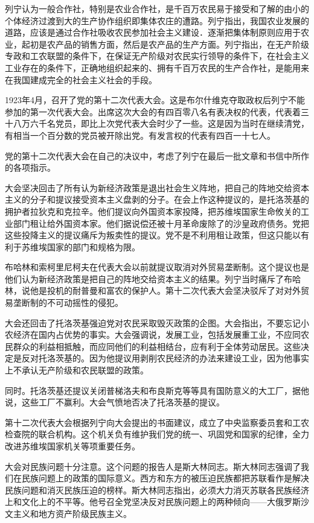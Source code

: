 列宁认为一般合作社，特别是农业合作社，是千百万农民易于接受和了解的由小的个体经济过渡到大的生产协作组织即集体农庄的遭路。列宁指出，我国农业发展的道路，应该是通过合作社吸收农民参加社会主义建设．逐渐把集体制原则应用于农业，起初是农产品的销售方面，然后是农产品的生产方面。列宁指出，在无产阶级专政和工农联盟的条件下，在保证无产阶级对农民实行领导的条件下，在社会主义工业存在的条件下，正确地组织起来的、拥有千百万农民的生产合作社，是能用来在我国建成完全的社会主义社会的手段。

1923年4月，召开了党的第十二次代表大会。这是布尔什维克夺取政权后列宁不能参加的第一次代表大会。出席这次大会的有四百零八名有表决权的代表，代表着三十八万六千名党员，即比上次党代表大会时少了一些。这是因为当时在继续清党，有相当一个百分数的党员被开除出党。有发言权的代表有四百一十七人。

党的第十二次代表大会在自己的决议中，考虑了列宁在最后一批文章和书信中所作的各项指示。

大会坚决回击了所有认为新经济政策是退出社会生义阵地，把自己的阵地交给资本主义的分子和提议接受资本主义盘剥的分子。在会上作这种提议的，是托洛茨基的拥护者拉狄克和克拉辛。他们提议向外国资本家投降，把苏维埃国家生命攸关的工业部门租让给外国资本家。他们据说偿还被十月革命废除了的沙皇政府债务。党把这些投降主义的提议痛斥为叛卖性的提议。党不是不利用租让政策，但这只能以有利于苏维埃国家的部门和规格为限。

布哈林和索柯里尼柯夫在代表大会以前就提议取消对外贸易垄断制。这个提议也是他们认为新经济政策是把自己的阵地交给资本主义的结果。列宁当时痛斥了布哈林，说他是投机的耐普曼和富农的保护人。第十二次代表大会坚决驳斥了对对外贸易垄断制的不可动摇性的侵犯。

大会还回击了托洛茨基强迫党对农民采取毁灭政策的企图。大会指出，不要忘记小农经济在国内占优势的事实。大会强调说，发展工业，包括发展重工业，不应同农民群众的利益相抵触，而应同他们的利益相结台，应有利于全体劳动居民。这些决定是反对托洛茨基的。因为他提议用剥削农民经济的办法来建设工业，因为他事实上不承认无产阶级和农民联盟的政策。

同时。托洛茨基还提议关闭普梯洛夫和布良斯克等等具有国防意义的大工厂，据他说，这些工厂不赢利。大会气愤地否决了托洛茨基的提议。

第十二次代表大会根据列宁向大会提出的书面建议，成立了中央监察委员套和工农检查院的联合机构。这个机关负有维护我们党的统一、巩固党和国家的纪律，全力改进苏维埃国家机关等项重要任务。

大会对民族问题十分注意。这个问题的报告人是斯大林同志。斯大林同志强调了我们在民族问题上的政策的国际意义。西方和东方的被压迫民族都把苏联看作是解决民族问题和消灭民族压迫的榜样。斯大林同志指出，必须大力消灭苏联各民族经济上和文化上的不平等。他号召全党坚决反对民族问题上的两种倾向——大俄罗斯沙文主义和地方资产阶级民族主义。

